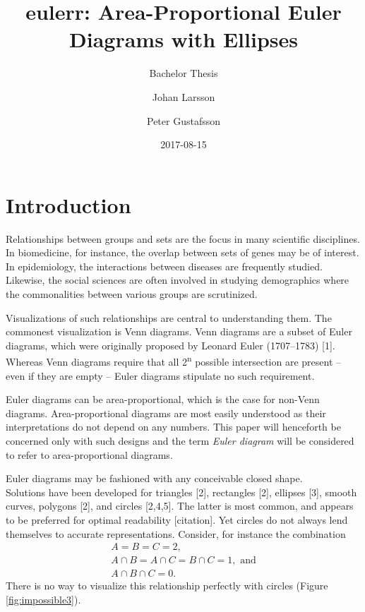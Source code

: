 \documentclass[
  headsepline=true,headings=standardclasses%
]{scrartcl}
\title{eulerr: Area-Proportional Euler Diagrams with Ellipses}
\subtitle{Bachelor Thesis}
\author[]{Johan Larsson}
\author[]{Peter Gustafsson}
\affil[]{Lund University}
\date{2017-08-15}
\theoremstyle{definition}
\theoremstyle{definition}
\theoremstyle{remark}
\begin{document}
\maketitle



\hypersetup{linkcolor=black}
\setcounter{tocdepth}{2}
\tableofcontents



\section{Introduction}\label{introduction}

Relationships between groups and sets are the focus in many scientific
disciplines. In biomedicine, for instance, the overlap between sets of
genes may be of interest. In epidemiology, the interactions between
diseases are frequently studied. Likewise, the social sciences are often
involved in studying demographics where the commonalities between
various groups are scrutinized.

Visualizations of such relationships are central to understanding them.
The commonest visualization is Venn diagrams. Venn diagrams are a subset
of Euler diagrams, which were originally proposed by Leonard Euler
(1707--1783) {[}1{]}. Whereas Venn diagrams require that all
2\textsuperscript{n} possible intersection are present -- even if they
are empty -- Euler diagrams stipulate no such requirement.

Euler diagrams can be area-proportional, which is the case for non-Venn
diagrams. Area-proportional diagrams are most easily understood as their
interpretations do not depend on any numbers. This paper will henceforth
be concerned only with such designs and the term \emph{Euler diagram}
will be considered to refer to area-proportional diagrams.

Euler diagrams may be fashioned with any conceivable closed shape.\\
Solutions have been developed for triangles {[}2{]}, rectangles {[}2{]},
ellipses {[}3{]}, smooth curves, polygons {[}2{]}, and circles
{[}2,4,5{]}. The latter is most common, and appears to be preferred for
optimal readability {[}citation{]}. Yet circles do not always lend
themselves to accurate representations. Consider, for instance the
combination \[
\begin{gathered}
A = B = C = 2,\\
A \cap B = A \cap C = B \cap C = 1, \text{ and}\\
A \cap B \cap C = 0.
\end{gathered}
\] There is no way to visualize this relationship perfectly with circles
(Figure \ref{fig:impossible3}).
\end{document}
